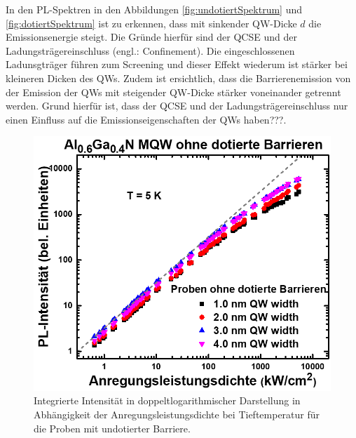 \noindent 
% 
In den PL-Spektren in den Abbildungen \ref{fig:undotiertSpektrum} und \ref{fig:dotiertSpektrum}
ist zu erkennen, dass mit sinkender QW-Dicke $d$ die Emissionsenergie steigt. Die Gründe hierfür sind der QCSE und der Ladungsträgereinschluss (engl.: Confinement). Die eingeschlossenen Ladunsgträger führen zum Screening und dieser Effekt wiederum ist stärker bei kleineren Dicken des QWs. Zudem ist ersichtlich, dass die Barrierenemission von der Emission der QWs mit steigender QW-Dicke stärker voneinander getrennt werden. Grund hierfür ist, dass der QCSE und der Ladungsträgereinschluss nur einen Einfluss auf die Emissionseigenschaften der QWs haben???.
%
\begin{figure}[H]
  \centering
  \begin{minipage}[t]{0.49\textwidth}
    \centering
    \includegraphics[width=\textwidth]{Bilder/MQWdickenSerie/intTTundotiert.png}
		\caption{Integrierte Intensität in doppeltlogarithmischer Darstellung in Abhängigkeit der Anregungsleistungsdichte bei Tieftemperatur für die Proben mit undotierter Barriere.}
    \label{fig:undotiertint}
  \end{minipage}
	\hfill
  \begin{minipage}[t]{0.49\textwidth}
    \centering

\end{minipage}
\end{figure}
